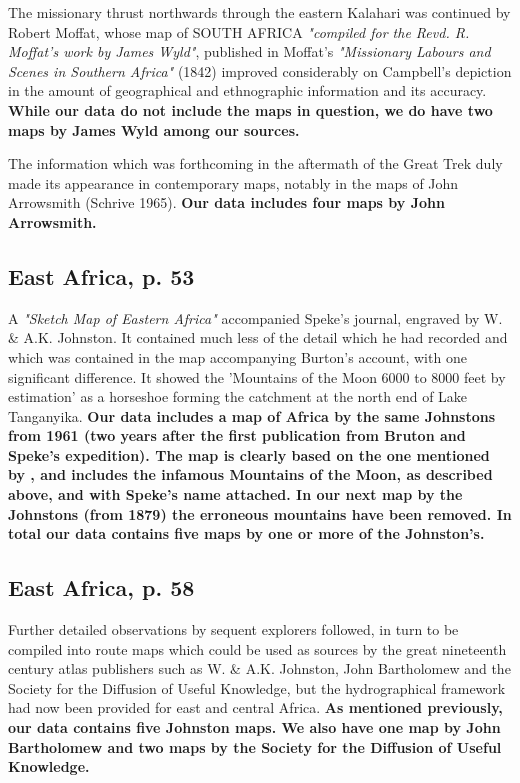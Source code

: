 \documentclass[12pt]{article}
\begin{document}
The missionary thrust northwards through the eastern Kalahari was continued by 
Robert Moffat, whose map of SOUTH AFRICA \textit{"compiled for the Revd. R. 
Moffat's work by James Wyld"}, published in Moffat's \textit{"Missionary Labours
and Scenes in Southern Africa"} (1842) improved considerably on Campbell's 
depiction in the amount of geographical and ethnographic information and its 
accuracy. \textbf{While our data do not include the maps in question, we do have
two maps by James Wyld among our sources.}

The information which was forthcoming in the aftermath of the Great Trek duly
made its appearance in contemporary maps, notably in the maps of John Arrowsmith
(Schrive 1965). \textbf{Our data includes four maps by John Arrowsmith.}

\subsection{East Africa, p. 53}

A \textit{"Sketch Map of Eastern Africa"} accompanied Speke's journal, engraved
by W. \& A.K. Johnston. It contained much less of the detail which he had
recorded and which was contained in the map accompanying Burton's account, with
one significant difference. It showed the 'Mountains of the Moon 6000 to 8000
feet by estimation' as a horseshoe forming the catchment at the north end of
Lake Tanganyika. \textbf{Our data includes a map of Africa by the same
	Johnstons from 1961 (two years after the first publication from Bruton
	and Speke's expedition). The map is clearly based on the one mentioned
	by \citet{Stone1995}, and includes the infamous Mountains of the Moon,
	as described above, and with Speke's name attached. In our next map by
the Johnstons (from 1879) the erroneous mountains have been removed. In total
our data contains five maps by one or more of the Johnston's.}

\subsection{East Africa, p. 58}

Further detailed observations by sequent explorers followed, in turn to be
compiled into route maps which could be used as sources by the great nineteenth
century atlas publishers such as W. \& A.K. Johnston, John Bartholomew and the
Society for the Diffusion of Useful Knowledge, but the hydrographical framework
had now been provided for east and central Africa. \textbf{As mentioned
previously, our data contains five Johnston maps. We also have one map by John
Bartholomew and two maps by the Society for the Diffusion of Useful Knowledge.}
\end{document}
